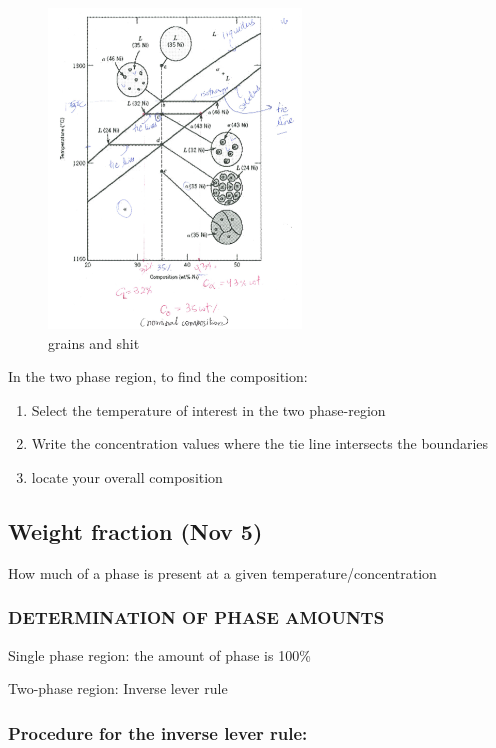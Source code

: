 \documentclass{article}
\begin{document}
\begin{figure}[H]
	\centering
	\includegraphics[width=0.60\textwidth]{assets/1149aa48.png}
	\caption{grains and shit}
\end{figure}

In the two phase region, to find the composition:
\begin{enumerate}
    \item Select the temperature of interest in the two phase-region
    \item Write the concentration values where the tie line intersects the boundaries
    \item locate your overall composition
\end{enumerate}

\subsection{Weight fraction (Nov 5)}

How much of a phase is present at a given temperature/concentration

\subsubsection{DETERMINATION OF PHASE AMOUNTS}

Single phase region: the amount of phase is 100\%

Two-phase region: Inverse lever rule

\subsubsection{Procedure for the inverse lever rule:}
\end{document}
